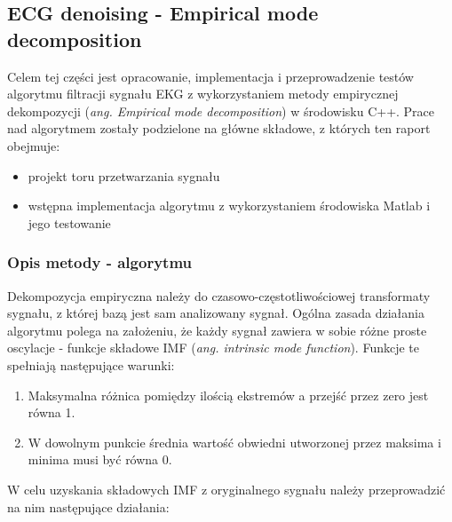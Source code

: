 \documentclass[a4paper]{article}
\begin{document}
\subsection{ECG denoising - Empirical mode decomposition}
Celem tej części jest opracowanie, implementacja i przeprowadzenie testów algorytmu filtracji sygnału EKG z wykorzystaniem metody empirycznej dekompozycji (\textit {ang. Empirical mode decomposition}) w środowisku C++. Prace nad algorytmem zostały podzielone na główne składowe, z których ten raport obejmuje: 
\begin{itemize}
	\item projekt toru przetwarzania sygnału
	\item wstępna implementacja algorytmu z wykorzystaniem środowiska Matlab i jego testowanie
\end{itemize}

\subsubsection{Opis metody - algorytmu}
Dekompozycja empiryczna należy do czasowo-częstotliwościowej transformaty sygnału, z której bazą jest sam analizowany sygnał. Ogólna zasada działania algorytmu polega na założeniu, że każdy sygnał zawiera w sobie różne proste oscylacje - funkcje składowe IMF (\textit {ang. intrinsic mode function}). Funkcje te spełniają następujące warunki: 

\begin{enumerate}
	\item Maksymalna różnica pomiędzy ilością ekstremów a przejść przez zero jest równa 1.
	\item W dowolnym punkcie średnia wartość obwiedni utworzonej przez maksima i minima musi być równa 0.
\end{enumerate}

W celu uzyskania składowych IMF z oryginalnego sygnału należy przeprowadzić na nim następujące działania: 
\end{document}
